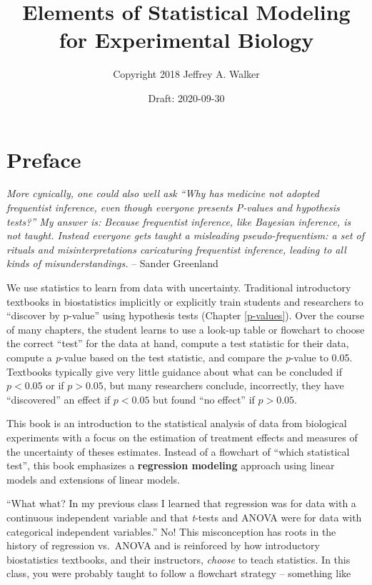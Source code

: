 \documentclass[]{book}
\title{Elements of Statistical Modeling for Experimental Biology}
\author{Copyright 2018 Jeffrey A. Walker}
\date{Draft: 2020-09-30}
\begin{document}
\maketitle

{
\setcounter{tocdepth}{1}
\tableofcontents
}
\hypertarget{preface}{%
\chapter*{Preface}\label{preface}}

\emph{More cynically, one could also well ask ``Why has medicine not adopted frequentist inference, even though everyone presents P-values and hypothesis tests?'' My answer is: Because frequentist inference, like Bayesian inference, is not taught. Instead everyone gets taught a misleading pseudo-frequentism: a set of rituals and misinterpretations caricaturing frequentist inference, leading to all kinds of misunderstandings.} -- Sander Greenland

We use statistics to learn from data with uncertainty. Traditional introductory textbooks in biostatistics implicitly or explicitly train students and researchers to ``discover by p-value'' using hypothesis tests (Chapter \ref{p-values}). Over the course of many chapters, the student learns to use a look-up table or flowchart to choose the correct ``test'' for the data at hand, compute a test statistic for their data, compute a \emph{p}-value based on the test statistic, and compare the \emph{p}-value to 0.05. Textbooks typically give very little guidance about what can be concluded if \(p < 0.05\) or if \(p > 0.05\), but many researchers conclude, incorrectly, they have ``discovered'' an effect if \(p < 0.05\) but found ``no effect'' if \(p > 0.05\).

This book is an introduction to the statistical analysis of data from biological experiments with a focus on the estimation of treatment effects and measures of the uncertainty of theses estimates. Instead of a flowchart of ``which statistical test'', this book emphasizes a \textbf{regression modeling} approach using linear models and extensions of linear models.

``What what? In my previous class I learned that regression was for data with a continuous independent variable and that \emph{t}-tests and ANOVA were for data with categorical independent variables.'' No! This misconception has roots in the history of regression vs.~ANOVA and is reinforced by how introductory biostatistics textbooks, and their instructors, \emph{choose} to teach statistics. In this class, you were probably taught to follow a flowchart strategy -- something like
\end{document}
